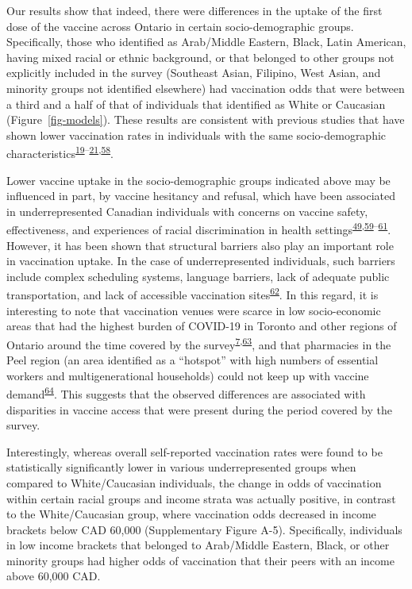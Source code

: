 \documentclass[
]{article}
\begin{document}
Our results show that indeed, there were differences in the uptake of
the first dose of the vaccine across Ontario in certain
socio-demographic groups. Specifically, those who identified as
Arab/Middle Eastern, Black, Latin American, having mixed racial or
ethnic background, or that belonged to other groups not explicitly
included in the survey (Southeast Asian, Filipino, West Asian, and
minority groups not identified elsewhere) had vaccination odds that were
between a third and a half of that of individuals that identified as
White or Caucasian (Figure~\ref{fig-models}). These results are
consistent with previous studies that have shown lower vaccination rates
in individuals with the same socio-demographic
characteristics\textsuperscript{\protect\hyperlink{ref-guay2022}{19}--\protect\hyperlink{ref-hussain2022}{21},\protect\hyperlink{ref-carter2022}{58}}.

Lower vaccine uptake in the socio-demographic groups indicated above may
be influenced in part, by vaccine hesitancy and refusal, which have been
associated in underrepresented Canadian individuals with concerns on
vaccine safety, effectiveness, and experiences of racial discrimination
in health
settings\textsuperscript{\protect\hyperlink{ref-cnat2022a}{49},\protect\hyperlink{ref-basta2022}{59}--\protect\hyperlink{ref-cnat2023}{61}}.
However, it has been shown that structural barriers also play an
important role in vaccination uptake. In the case of underrepresented
individuals, such barriers include complex scheduling systems, language
barriers, lack of adequate public transportation, and lack of accessible
vaccination
sites\textsuperscript{\protect\hyperlink{ref-njoku2021}{62}}. In this
regard, it is interesting to note that vaccination venues were scarce in
low socio-economic areas that had the highest burden of COVID-19 in
Toronto and other regions of Ontario around the time covered by the
survey\textsuperscript{\protect\hyperlink{ref-bogoch2022}{7},\protect\hyperlink{ref-iveniuk2021}{63}},
and that pharmacies in the Peel region (an area identified as a
``hotspot'' with high numbers of essential workers and multigenerational
households) could not keep up with vaccine
demand\textsuperscript{\protect\hyperlink{ref-gill2022}{64}}. This
suggests that the observed differences are associated with disparities
in vaccine access that were present during the period covered by the
survey.

Interestingly, whereas overall self-reported vaccination rates were
found to be statistically significantly lower in various
underrepresented groups when compared to White/Caucasian individuals,
the change in odds of vaccination within certain racial groups and
income strata was actually positive, in contrast to the White/Caucasian
group, where vaccination odds decreased in income brackets below CAD
60,000 (Supplementary Figure A-5). Specifically, individuals in low
income brackets that belonged to Arab/Middle Eastern, Black, or other
minority groups had higher odds of vaccination that their peers with an
income above 60,000 CAD.
\end{document}
